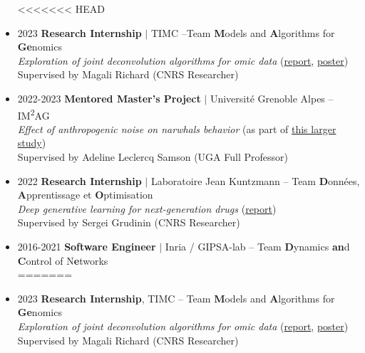 \documentclass{article}
\begin{document}
\begin{itemize}
<<<<<<< HEAD
    \item[] 2023 \tabto{2cm} \textbf{Research Internship} $\vert$ TIMC –Team \textbf{M}odels and \textbf{A}lgorithms for \textbf{Ge}nomics \\[.1 cm]
    \tabto{2cm} \textit{Exploration of joint deconvolution algorithms for omic data} (\href{https://vadmbertr.github.io/material/reports/M2_Internship_report__Exploration_of_joint_deconvolution_algorithms_for_omic_data.pdf}{report}, \href{https://vadmbertr.github.io/material/posters/poster_jobim_ismb.pdf}{poster}) \\[.1 cm]
    \tabto{2cm} Supervised by Magali Richard (CNRS Researcher)
    
    \item[] 2022-2023 \tabto{2cm} \textbf{Mentored Master's Project} $\vert$ Université Grenoble Alpes – IM\textsuperscript{2}AG \\[.1 cm]
    \tabto{2cm} \textit{Effect of anthropogenic noise on narwhals behavior} (as part of \href{https://doi.org/10.1126/sciadv.ade0440}{this larger study}) \\[.1 cm]
    \tabto{2cm} Supervised by Adeline Leclercq Samson (UGA Full Professor)
    
    \item[] 2022 \tabto{2cm} \textbf{Research Internship} $\vert$ Laboratoire Jean Kuntzmann – Team \textbf{D}onnées, \textbf{A}pprentissage et \textbf{O}ptimisation \\[.1 cm]
    \tabto{2cm} \textit{Deep generative learning for next-generation drugs} (\href{https://vadmbertr.github.io/material/reports/Internship_report___Deep_generative_learning_for_next_generation_drugs.pdf}{report}) \\[.1 cm]
    \tabto{2cm} Supervised by Sergei Grudinin (CNRS Researcher)
    
    \item[] 2016-2021 \tabto{2cm} \textbf{Software Engineer} $\vert$ Inria / GIPSA-lab – Team \textbf{D}ynamics \textbf{an}d \textbf{C}ontrol of N\textbf{e}tworks\\[.1 cm]
=======
    \item[] 2023 \tabto{2cm} \textbf{Research Internship}, TIMC – Team \textbf{M}odels and \textbf{A}lgorithms for \textbf{Ge}nomics \\[.1 cm]
    \tabto{2cm} \textit{Exploration of joint deconvolution algorithms for omic data} (\href{https://vadmbertr.github.io/material/reports/M2_Internship_report__Exploration_of_joint_deconvolution_algorithms_for_omic_data.pdf}{report}, \href{https://vadmbertr.github.io/material/posters/poster_jobim_ismb.pdf}{poster}) \\[.1 cm]
    \tabto{2cm} Supervised by Magali Richard (CNRS Researcher)
    

\end{itemize}
\end{document}
